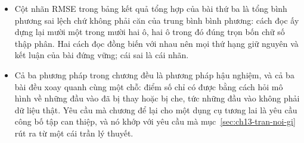 \begin{tomtat}
\begin{itemize}
giá trị điểm ảnh chứ không theo dấu của điểm số. Ở bài thứ ba, định lý về tính
vắng mặt chứng minh một phát biểu khác với tiên đề nó mang tên, và câu nói rằng
tính nhất quán cũng đúng cho điểm số đã chuẩn hóa thì sai, vì hệ số chuẩn hóa
phụ thuộc vào mô hình còn tính nhất quán so hai mô hình.
  \item Cột nhãn RMSE trong bảng kết quả tổng hợp của bài thứ ba là tổng bình
phương sai lệch chứ không phải căn của trung bình bình phương: cách đọc ấy dựng
lại mười một trong mười hai ô, hai ô trong đó đúng trọn bốn chữ số thập phân.
Hai cách đọc đồng biến với nhau nên mọi thứ hạng giữ nguyên và kết luận của bài
đứng vững; cái sai là cái nhãn.
  \item Cả ba phương pháp trong chương đều là phương pháp hậu nghiệm, và cả ba
bài đều xoay quanh cùng một chỗ: điểm số chỉ có được bằng cách hỏi mô hình về
những đầu vào đã bị thay hoặc bị che, tức những đầu vào không phải dữ liệu
thật. Yêu cầu mà chương để lại cho một dụng cụ tương lai là yêu cầu công bố tập
can thiệp, và nó khớp với yêu cầu mà mục~\ref{sec:ch13-tran-noi-gi} rút ra từ
một cái trần lý thuyết.
\end{itemize}
\end{tomtat}

